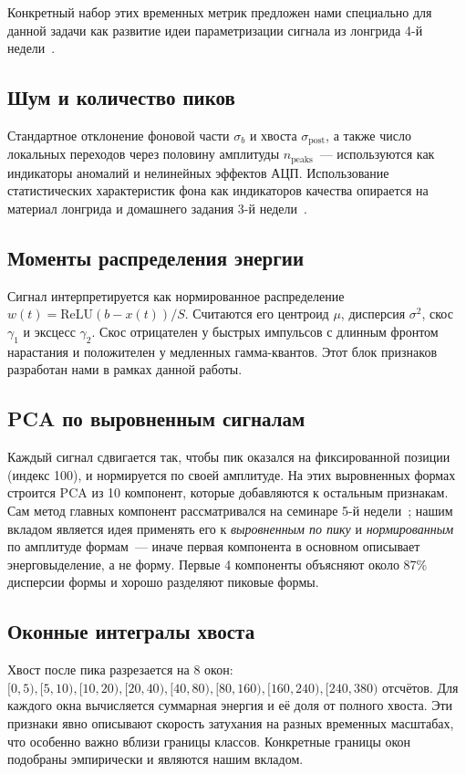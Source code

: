 \documentclass[11pt,a4paper]{article}
\begin{document}
Конкретный набор этих временных метрик предложен нами специально
для данной задачи как развитие идеи параметризации сигнала из
лонгрида 4-й недели~\cite{lr4}.

\subsection{Шум и количество пиков}

Стандартное отклонение фоновой части $\sigma_b$ и хвоста
$\sigma_\text{post}$, а также число локальных переходов через
половину амплитуды $n_\text{peaks}$~--- используются как индикаторы
аномалий и нелинейных эффектов АЦП. Использование статистических
характеристик фона как индикаторов качества опирается на материал
лонгрида и домашнего задания 3-й недели~\cite{lr3}.

\subsection{Моменты распределения энергии}

Сигнал интерпретируется как нормированное распределение
$w(t) = \mathrm{ReLU}(b - x(t)) / S$. Считаются его центроид $\mu$,
дисперсия $\sigma^2$, скос $\gamma_1$ и эксцесс $\gamma_2$.
Скос отрицателен у быстрых импульсов с длинным фронтом нарастания
и положителен у медленных гамма-квантов. Этот блок признаков
разработан нами в рамках данной работы.

\subsection{PCA по выровненным сигналам}

Каждый сигнал сдвигается так, чтобы пик оказался на фиксированной
позиции (индекс 100), и нормируется по своей амплитуде. На этих
выровненных формах строится PCA из 10 компонент, которые добавляются
к остальным признакам. Сам метод главных компонент рассматривался
на семинаре 5-й недели~\cite{lr5}; нашим вкладом является идея
применять его к \emph{выровненным по пику} и \emph{нормированным}
по амплитуде формам~--- иначе первая компонента в основном описывает
энерговыделение, а не форму. Первые 4 компоненты объясняют около
87\% дисперсии формы и хорошо разделяют пиковые формы.

\subsection{Оконные интегралы хвоста}

Хвост после пика разрезается на 8 окон:
$[0, 5), [5, 10), [10, 20), [20, 40), [40, 80), [80, 160), [160, 240),
[240, 380)$ отсчётов. Для каждого окна вычисляется суммарная
энергия и её доля от полного хвоста. Эти признаки явно описывают
скорость затухания на разных временных масштабах, что особенно
важно вблизи границы классов. Конкретные границы окон подобраны
эмпирически и являются нашим вкладом.
\end{document}
